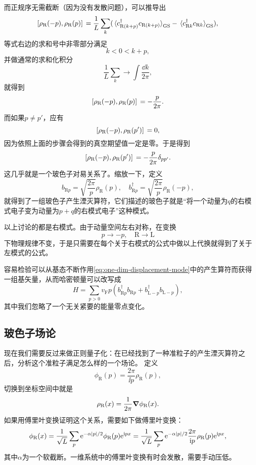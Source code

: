 而正规序无需截断（因为没有发散问题），可以推导出
\[
    \comm*{{\rho}_\text{R}(- p)}{{\rho}_\text{R}(p)} = \frac{1}{L} \sum_{k} (\expval*{{c}^\dagger_{\text{R} (k + p)} {c}_{\text{R} (k + p)}}_\text{GS} - \expval*{{c}^\dagger_{\text{R} k} {c}_{\text{R} k}}_\text{GS}),
\]
等式右边的求和号中非零部分满足
\[
    k < 0 < k + p,
\]
并做通常的求和化积分
\[
    \frac{1}{L} \sum_k \longrightarrow \int \frac{\dd{k}}{2\pi},
\]
就得到
\[
    \comm*{{\rho}_\text{R}(- p)}{{\rho}_\text{R}(p)} = - \frac{p}{2\pi}.
\]
而如果$p \neq p'$，应有
\[
    \comm*{{\rho}_\text{R}(- p)}{{\rho}_\text{R}(p')} = 0,
\]
因为依照上面的步骤会得到的真空期望值一定是零。于是得到
\begin{equation}
    \comm*{{\rho}_\text{R}(- p)}{{\rho}_\text{R}(p')} = - \frac{p}{2\pi} \delta_{pp'}.
\end{equation}
这几乎就是一个玻色子对易关系了。缩放一下，定义
\begin{equation}
    {b}_{\text{R} p} = \sqrt{\frac{2\pi}{p}} {\rho}_\text{R}(p), \quad {b}^\dagger_{\text{R} p} = \sqrt{\frac{2\pi}{p}} {\rho}_\text{R}(-p),
    \label{eq:one-dim-displacement-mode}
\end{equation}
就得到了一组玻色子产生湮灭算符，它们描述的玻色子就是“将一个动量为$q$的右模式电子变为动量为$p+q$的右模式电子”这种模式。

以上讨论的都是右模式。由于动量空间左右对称，在变换
\[
    p \longrightarrow -p, \quad \text{R} \longrightarrow \text{L}
\]
下物理规律不变，于是只需要在每个关于右模式的公式中做以上代换就得到了关于左模式的公式。

容易检验可以从基态不断作用\eqref{eq:one-dim-displacement-mode}中的产生算符而获得一组基矢量，从而哈密顿量可以改写成
\begin{equation}
    {H} = \sum_{p > 0} v_\text{F} p \left({b}_{\text{R} p}^\dagger {b}_{\text{R} p} + {b}_{\text{L} -p}^\dagger {b}_{\text{L} -p} \right),
    \label{eq:one-dim-displacement-hamiltonian}
\end{equation}
其中我们忽略了一个无关紧要的能量零点变化。

\subsection{玻色子场论}

现在我们需要反过来做正则量子化：在已经找到了一种准粒子的产生湮灭算符之后，分析这个准粒子满足怎么样的一个场论。
定义
\begin{equation}
    {\phi}_\text{R}(p) = \frac{2\pi}{\ii p} {\rho}_\text{R}(p),
    \label{eq:one-dim-phi}
\end{equation}
切换到坐标空间中就是
\[
    {\rho}_\text{R}(x) = \frac{1}{2\pi} \grad \phi_\text{R}(x).
\]
如果用傅里叶变换证明这个关系，需要如下做傅里叶变换：
\begin{equation}
    {\phi}_\text{R} (x) = \frac{1}{\sqrt{L}} \sum_p \mathrm{e}^{- \alpha \abs{p} / 2} \phi_\text{R}(p) \mathrm{e}^{\mathrm{i} p x} = \frac{1}{\sqrt{L}} \sum_p \mathrm{e}^{- \alpha \abs{p} / 2} \frac{2\pi}{\mathrm{i} p} {\rho}_\text{R}(p) \mathrm{e}^{\mathrm{i} p x},
    \label{eq:one-dim-phi-and-rho}
\end{equation}
其中$\alpha$为一个软截断。一维系统中的傅里叶变换有时会发散，需要手动压低。

